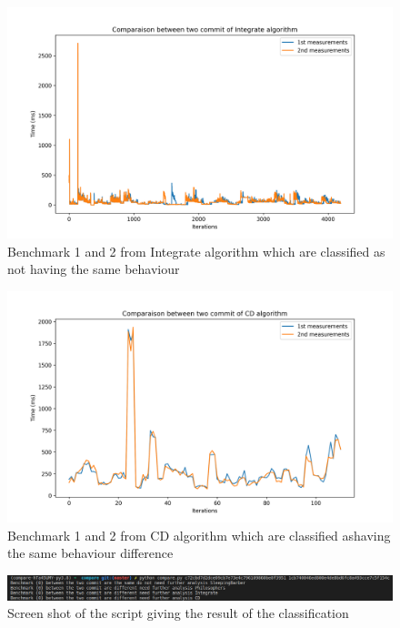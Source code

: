 \documentclass{article}
\begin{document}
\begin{figure}[]
    \centering
    \includegraphics[width=1\textwidth]{images/plot_Integrate_159.78600000000006.png}
    \caption{Benchmark 1 and 2 from Integrate algorithm which are classified as not having the same behaviour}
    \label{fig:bench_1_2_3}
\end{figure}


\begin{figure}[]
    \centering
    \includegraphics[width=1\textwidth]{images/plot_CD_100.56999999999994.png}
    \caption{Benchmark 1 and 2 from CD algorithm which are classified ashaving the same behaviour difference}
    \label{fig:bench_1_2_3}
\end{figure}


\begin{figure}[]
    \centering
    \includegraphics[width=1\textwidth]{images/Screenshot_20200829_135418.png}
    \caption{Screen shot of the script giving the result of the classification}
    \label{fig:bench_1_2_4}
\end{figure}
\end{document}
